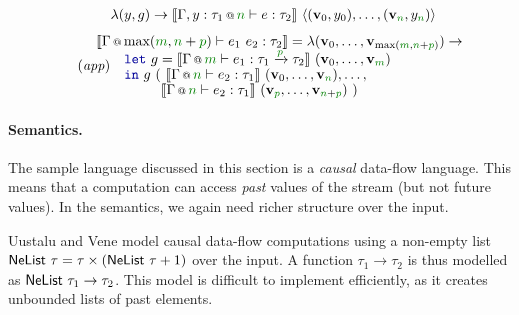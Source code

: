 \begin{figure}
\begin{equation}
\begin{array}{l}
  \qquad\lambda (y, g) \rightarrow \sem{ \coctx{\Gamma,y:\tau_1}{\cclrd{n}} \vdash e : \tau_2 
    }~\langle (\mathbf{v}_0, y_0), \ldots, (\mathbf{v}_{ \cclrd{n}  }, y_{ \cclrd{n} } ) \rangle
\end{array}
\end{equation}
\vspace{-0.5em}
\begin{equation*}
\tag{\emph{app}}
\hspace{-1.5em}
\begin{array}{l}
  \sem{\coctx{\Gamma}{\textnormal{max}(\cclrd{m}, \cclrd{n}+\cclrd{p})} \vdash e_1~e_2 : \tau_2 } = 
    \lambda (\mathbf{v}_0, \ldots, \mathbf{v}_{ \textnormal{max}(\cclrd{m}, \cclrd{n}+\cclrd{p}) } ) \rightarrow \\[-0.1em]
  \qquad\kvd{let}~g=\sem{ \coctx{\Gamma}{\cclrd{m}} \vdash e_1 : \tau_1 \xrightarrow{\cclrd{p}} \tau_2 
    }~(\mathbf{v}_0, \ldots, \mathbf{v}_{ \cclrd{m} })\\[-0.1em]
  \qquad\kvd{in}~g~(~\sem{ \coctx{\Gamma}{\cclrd{n}} \vdash e_2 : \tau_1 }~(\mathbf{v}_0, \ldots, \mathbf{v}_{ \cclrd{n} }),\ldots, \\[-0.1em]
  \qquad\qquad\;~\sem{ \coctx{\Gamma}{\cclrd{n}} \vdash e_2 : \tau_1 }~(\mathbf{v}_{ \cclrd{p} }, \ldots, \mathbf{v}_{ \cclrd{n}+\cclrd{p} })~)
\end{array}
\end{equation*}

\label{fig:applications-flat-dfsem}
\end{figure}


\paragraph{Semantics.}
The sample language discussed in this section is a \emph{causal} data-flow language. This means that
a computation can access \emph{past} values of the stream (but not future values). In the semantics, 
we again need richer structure over the input.

Uustalu and Vene \cite{comonads-notions} model causal data-flow computations using a non-empty list
$\ident{NeList}~\tau = \tau \times (\ident{NeList}~\tau + 1)$ over the input. A function $\tau_1 \rightarrow \tau_2$
is thus modelled as $\textnormal{\sffamily NeList}~\tau_1 \rightarrow \tau_2$. This model is difficult to implement
efficiently, as it creates unbounded lists of past elements.

